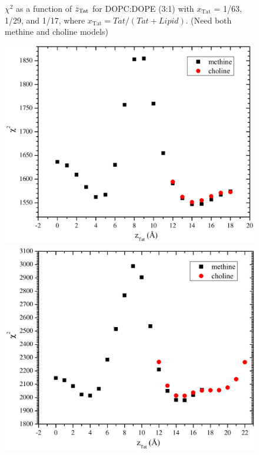 \begin{figure}[htbp]
  \caption{$\chi^2$ as a function of $z_\textrm{Tat}$ for DOPC:DOPE (3:1) with 
  $x_\textrm{Tat}$ = 1/63, 1/29, and 1/17, where $x_\textrm{Tat}=Tat/(Tat+Lipid)$.
  (Need both methine and choline models)}
  \label{fig:DOPCDOPE3to1_Tat_X2}
\end{figure}
\begin{figure}[htbp]
  \centering
  \includegraphics[scale=0.3]{./figures/Tat/SDP_Results/DOPCDOPE1to1_Tat_62to1_X2}
  \includegraphics[scale=0.3]{./figures/Tat/SDP_Results/DOPCDOPE1to1_Tat_28to1_X2}

\end{figure}

